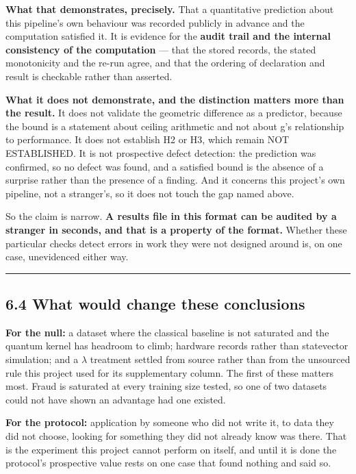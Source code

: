 \documentclass[
  10pt,
]{article}
\begin{document}
\textbf{What that demonstrates, precisely.} That a quantitative
prediction about this pipeline's own behaviour was recorded publicly in
advance and the computation satisfied it. It is evidence for the
\textbf{audit trail and the internal consistency of the computation} ---
that the stored records, the stated monotonicity and the re-run agree,
and that the ordering of declaration and result is checkable rather than
asserted.

\textbf{What it does not demonstrate, and the distinction matters more
than the result.} It does not validate the geometric difference as a
predictor, because the bound is a statement about ceiling arithmetic and
not about g's relationship to performance. It does not establish H2 or
H3, which remain NOT ESTABLISHED. It is not prospective defect
detection: the prediction was confirmed, so no defect was found, and a
satisfied bound is the absence of a surprise rather than the presence of
a finding. And it concerns this project's own pipeline, not a
stranger's, so it does not touch the gap named above.

So the claim is narrow. \textbf{A results file in this format can be
audited by a stranger in seconds, and that is a property of the format.}
Whether these particular checks detect errors in work they were not
designed around is, on one case, unevidenced either way.

\begin{center}\rule{0.5\linewidth}{0.5pt}\end{center}

\subsection{6.4 What would change these
conclusions}\label{what-would-change-these-conclusions}

\textbf{For the null:} a dataset where the classical baseline is not
saturated and the quantum kernel has headroom to climb; hardware records
rather than statevector simulation; and a \(\lambda\) treatment settled
from source rather than from the unsourced rule this project used for
its supplementary column. The first of these matters most. Fraud is
saturated at every training size tested, so one of two datasets could
not have shown an advantage had one existed.

\textbf{For the protocol:} application by someone who did not write it,
to data they did not choose, looking for something they did not already
know was there. That is the experiment this project cannot perform on
itself, and until it is done the protocol's prospective value rests on
one case that found nothing and said so.
\end{document}
